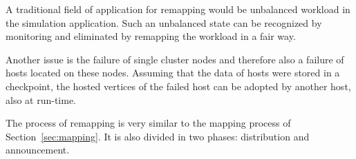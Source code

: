 A traditional field of application for remapping would be unbalanced
workload in the simulation application. Such an unbalanced state can
be recognized by monitoring and eliminated by remapping the workload
in a fair way.

Another issue is the failure of single cluster nodes and therefore
also a failure of hosts located on these nodes. Assuming that the data
of hosts were stored in a checkpoint, the hosted vertices of the failed host
can be adopted by another host, also at run-time.

The process of remapping is very similar to the mapping process of
Section~\ref{sec:mapping}.  It is also divided in two phases:
distribution and announcement.


\cleardoublepage

